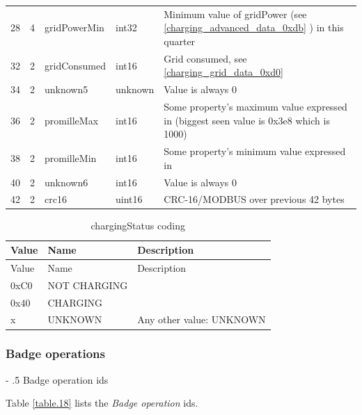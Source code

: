 \documentclass[a4paper]{article}
\makeatletter
\renewcommand\paragraph{%
   \@startsection{paragraph}{4}{0mm}%
      {-\baselineskip}%
      {.5\baselineskip}%
      {\normalfont\normalsize\bfseries}}
\newcommand{\secref}[1]{\ref{#1} \nameref{#1}}
\makeatother
\begin{document}
\begin{longtable}[]{llllp{9cm}}
	28     & 4     & gridPowerMin & int32 &  Minimum value of gridPower  (see \secref{charging_advanced_data_0xdb}) in this quarter  \\
	32     & 2     & gridConsumed & int16 &  Grid consumed, see \secref{charging_grid_data_0xd0}  \\
	34     & 2     & unknown5 & unknown &  Value is always 0  \\
	36     & 2     & promilleMax & int16 &  Some property's maximum value  expressed in  \textperthousand (biggest seen value is  0x3e8 which is 1000) \\
	38     & 2     & promilleMin & int16 &  Some property's minimum value  expressed in  \textperthousand \\
	40     & 2     & unknown6 & int16 &  Value is always 0 \\
	42     & 2      & crc16     & uint16     & CRC-16/MODBUS over previous 42 bytes       \\
\end{longtable}



\begin{longtable}[]{@{}lll@{}}
	\caption{chargingStatus coding}
	\label{table.98}
	\tabularnewline
	\toprule\noalign{}
	Value & Name     & Description              \\
	\midrule\noalign{}
	\endfirsthead
	\toprule\noalign{}
	Value & Name     & Description              \\
	\midrule\noalign{}
	\endhead
	\bottomrule\noalign{}
	\endlastfoot
	0xC0  &  NOT CHARGING  &                          \\
	0x40  & CHARGING &                          \\
	x      & UNKNOWN  & Any other value: UNKNOWN  \\
\end{longtable}
\hfill\break


\subsubsection{Badge operations}
\label{badge_operations}

\paragraph{Badge operation ids}
\label{badge_operation_ids}

Table \ref{table.18} lists the \emph{Badge operation} id\textquotesingle s.
\end{document}
